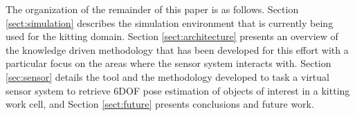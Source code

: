 




The organization of the remainder of this paper is as follows. Section \ref{sect:simulation} describes the simulation environment that is currently being used for the kitting domain. Section \ref{sect:architecture} presents an overview of the knowledge driven methodology that has been developed for this effort with a particular focus on the areas where the sensor system interacts with.  Section \ref{sec:sensor} details the tool and the methodology developed to task a virtual sensor system to retrieve 6DOF pose estimation of objects of interest in a kitting work cell, and Section \ref{sect:future} presents conclusions and future work.
